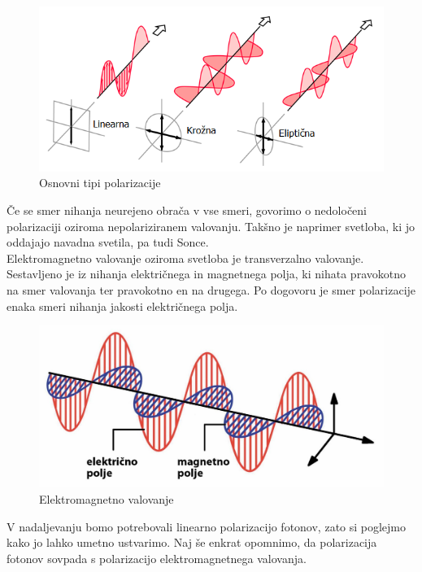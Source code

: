 \documentclass[A4paper, 11pt]{article}
\begin{document}
\begin{figure}[h]
\centering
\caption{Osnovni tipi polarizacije}
\includegraphics[scale=0.7]{3}
\end{figure}

\pagebreak

Če se smer nihanja neurejeno obrača v vse smeri, govorimo o nedoločeni polarizaciji oziroma nepolariziranem valovanju. Takšno je naprimer svetloba, ki jo oddajajo navadna svetila, pa tudi Sonce. \\

Elektromagnetno valovanje oziroma svetloba je transverzalno valovanje. Sestavljeno je iz nihanja električnega in magnetnega polja, ki nihata pravokotno na smer valovanja ter pravokotno en na drugega. Po dogovoru je smer polarizacije enaka smeri nihanja jakosti električnega polja.

\begin{figure}[h]
\centering
\caption{Elektromagnetno valovanje}
\includegraphics[scale=0.7]{emv}
\end{figure}

V nadaljevanju bomo potrebovali linearno polarizacijo fotonov, zato si poglejmo kako jo lahko umetno ustvarimo. Naj še enkrat opomnimo, da polarizacija fotonov sovpada s polarizacijo elektromagnetnega valovanja. 
\end{document}
